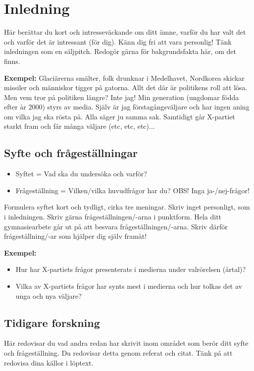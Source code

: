 \documentclass[11pt, a4paper, titlepage]{article}
\begin{document}
\setcounter{page}{2}
\tableofcontents
\newpage

\section{Inledning}
Här berättar du kort och intresseväckande om ditt ämne, varför du har valt det och varför det är intressant (för dig). Känn dig fri att vara personlig! Tänk inledningen som en säljpitch. Redogör gärna för bakgrundsfakta här, om det finns.  

\textbf{Exempel:}
Glaciärerna smälter, folk drunknar i Medelhavet, Nordkorea skickar missiler och människor tigger på gatorna. Allt det där är politikens roll att lösa. Men vem tror på politiken längre? Inte jag! Min generation (ungdomar födda efter år 2000) styrs av media. Själv är jag förstagångsväljare och har ingen aning om vilka jag ska rösta på. Alla säger ju samma sak. Samtidigt går X-partiet starkt fram och får många väljare (etc, etc, etc)... 

\subsection{Syfte och frågeställningar}

\begin{itemize}
	\item Syftet = Vad ska du undersöka och varför?
	\item Frågeställning = Vilken/vilka huvudfrågor har du? OBS! Inga ja-/nej-frågor!
\end{itemize}
Formulera syftet kort och tydligt, cirka tre meningar. Skriv inget personligt, som i inledningen. Skriv gärna frågeställningen/-arna i punktform. Hela ditt gymnasiearbete går ut på att besvara frågeställningen/-arna. Skriv därför frågeställning/-ar som hjälper dig själv framåt! 

\textbf{Exempel:}
\begin{itemize}
	\item Hur har X-partiets frågor presenterats i medierna under valrörelsen (årtal)? 
	\item Vilka av X-partiets frågor har synts mest i medierna och hur tolkas det av unga och nya väljare? 
\end{itemize}


\subsection{Tidigare forskning}
Här redovisar du vad andra redan har skrivit inom området som berör ditt syfte och frågeställning. Du redovisar detta genom referat och citat. Tänk på att redovisa dina källor i löptext. 
\end{document}
